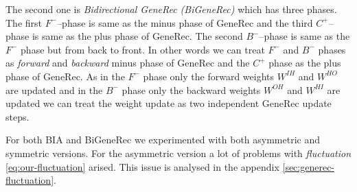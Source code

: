 The second one is \emph{Bidirectional GeneRec (BiGeneRec)} which has three phases. The first $F^{-}$--phase is same as the minus phase of GeneRec and the third $C^{+}$--phase is same as the plus phase of GeneRec. The second $B^{-}$--phase is same as the $F^{-}$ phase but from back to front. In other words we can treat $F^{-}$ and $B^{-}$ phases as \emph{forward} and \emph{backward} minus phase of GeneRec and the $C^{+}$ phase as the plus phase of GeneRec. As in the $F^{-}$ phase only the forward weights $W^{IH}$ and $W^{HO}$ are updated and in the $B^{-}$ phase only the backward weights $W^{OH}$ and $W^{HI}$ are updated we can treat the weight update as two independent GeneRec update steps. 

For both BIA and BiGeneRec we experimented with both asymmetric and symmetric versions. For the asymmetric version a lot of problems with \emph{fluctuation} \ref{eq:our-fluctuation} arised. This issue is analysed in the appendix \ref{sec:generec-fluctuation}. 

